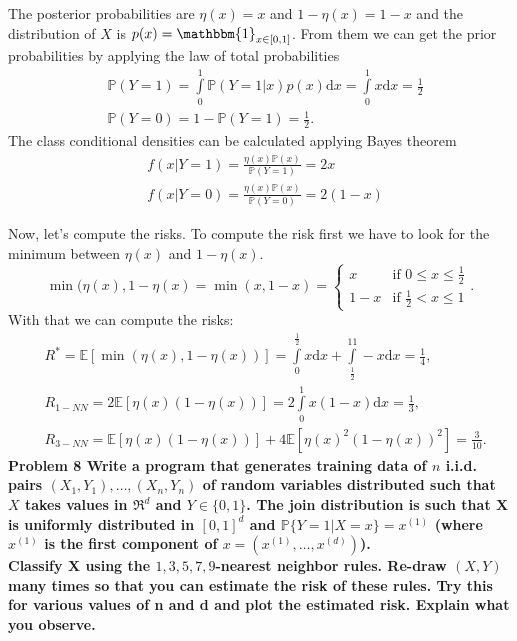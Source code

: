 \documentclass[11pt, english]{article}
\begin{document}
The posterior probabilities are $\eta(x)=x$ and $1-\eta(x)=1-x$ and the distribution of $X$ is $p(x)=\mathbbm{1}_{x\in[0,1]}$. From them we can get the prior probabilities by applying the law of total probabilities
\begin{align}
	&\mathbb{P}(Y=1)=\int\limits_0^1\mathbb{P}(Y=1|x)p(x)\text{d}x=\int\limits_0^1x\text{d}x=\frac{1}{2}\\
	&\mathbb{P}(Y=0)=1-\mathbb{P}(Y=1)=\frac{1}{2}.
\end{align}
The class conditional densities can be calculated applying Bayes theorem 
\begin{align}
	& f(x|Y=1)=\frac{\eta(x)\mathbb{P}(x)}{\mathbb{P}(Y=1)}=2x\\
	& f(x|Y=0)=\frac{\eta(x)\mathbb{P}(x)}{\mathbb{P}(Y=0)}=2(1-x)
\end{align}

Now, let's compute the risks. To compute the risk first we have to look for the minimum between $\eta(x)$ and $1-\eta(x)$.\begin{equation}
	\min(\eta(x),1-\eta(x)=\min(x,1-x)=\left\{\begin{array}{ll}
	x & \text{if }0\leq x\leq \frac{1}{2}\\
	1-x & \text{if }\frac{1}{2}< x\leq 1
	\end{array}\right..
\end{equation}
With that we can compute the risks:
\begin{align}
	&R^*=\mathbb{E}[\min(\eta(x),1-\eta(x))]=\int\limits_0^{\frac{1}{2}}x\text{d}x+\int\limits_{\frac{1}{2}}^11-x\text{d}x=\frac{1}{4},\\
	&R_{1-NN}=2\mathbb{E}[\eta(x)(1-\eta(x))]=2\int\limits_0^1 x(1-x)\text{d}x=\frac{1}{3},\\
	&R_{3-NN}=\mathbb{E}[\eta(x)(1-\eta(x))]+4\mathbb{E}[\eta(x)^2(1-\eta(x))^2]=\frac{3}{10}.
\end{align}
\newpage
\textbf{Problem 8 Write a program that generates training data of $n$ i.i.d. pairs $(X_1,Y_1),\dots,(X_n,Y_n)$ of
random variables distributed such that $X$ takes values in $\Re^d$ and $Y\in\{0,1\}$. The join distribution is such that X is uniformly distributed in $[0,1]^d$ and $\mathbb{P}\{Y=1|X=x\}=x^{(1)}$ (where $x^{(1)}$ is the first component of $x=(x^{(1)},\dots,x^{(d)})$).\\
Classify X using the $1,3,5,7,9$-nearest neighbor rules. Re-draw $(X,Y)$ many times so that you can estimate the risk of these rules. Try this for various values of n and d and plot the estimated risk. Explain what you observe.}
 
\end{document}

